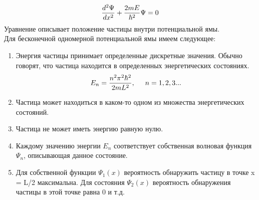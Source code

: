 \documentclass[__main__.tex]{subfiles}
\begin{document}
\begin{gather}
    \llabel{k-21-shredforzero}
    \frac{d^2\Psi}{dx^2}+\frac{2mE}{\hbar^2}\Psi=0
\end{gather}
Уравнение  описывает положение частицы внутри потенциальной ямы. \\
Для бесконечной одномерной потенциальной ямы имеем следующее:
\begin{enumerate}
    \item Энергия частицы принимает определенные дискретные значения. Обычно говорят, что частица находится в определенных энергетических состояниях.
          \begin{gather}
              E_n=\frac{n^2\mathcal{\pi}^2\hbar^2}{2mL^2}, \hspace{0.5cm} n=1,2,3...
          \end{gather}
    \item Частица может находиться в каком-то одном из множества энергетических состояний.
    \item Частица не может иметь энергию равную нулю.
    \item Каждому значению энергии $E_n$ соответствует собственная волновая функция $\Psi_n$, описывающая данное состояние.
    \item Для собственной функции $\Psi_1(x)$ вероятность обнаружить частицу в точке x = L/2 максимальна. Для состояния $\Psi_2(x)$ вероятность обнаружения частицы в этой точке равна 0 и т.д.
\end{enumerate}
\end{document}
